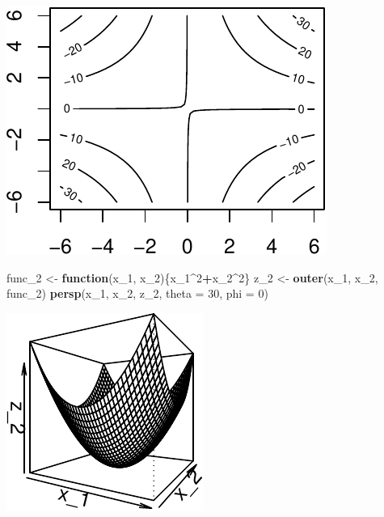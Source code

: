 \documentclass[11pt,]{article}
\newenvironment{Shaded}{\begin{snugshade}}{\end{snugshade}}
\newcommand{\KeywordTok}[1]{\textcolor[rgb]{0.13,0.29,0.53}{\textbf{#1}}}
\newcommand{\DataTypeTok}[1]{\textcolor[rgb]{0.13,0.29,0.53}{#1}}
\newcommand{\DecValTok}[1]{\textcolor[rgb]{0.00,0.00,0.81}{#1}}
\newcommand{\StringTok}[1]{\textcolor[rgb]{0.31,0.60,0.02}{#1}}
\newcommand{\ControlFlowTok}[1]{\textcolor[rgb]{0.13,0.29,0.53}{\textbf{#1}}}
\newcommand{\OperatorTok}[1]{\textcolor[rgb]{0.81,0.36,0.00}{\textbf{#1}}}
\newcommand{\NormalTok}[1]{#1}
\begin{document}
\begin{center}\includegraphics{Optimization_2_files/figure-latex/level_sets-2} \end{center}

\begin{Shaded}
\begin{Highlighting}[]
\NormalTok{func_}\DecValTok{2}\NormalTok{ <-}\StringTok{ }\ControlFlowTok{function}\NormalTok{(x_}\DecValTok{1}\NormalTok{, x_}\DecValTok{2}\NormalTok{)\{x_}\DecValTok{1}\OperatorTok{^}\DecValTok{2}\OperatorTok{+}\NormalTok{x_}\DecValTok{2}\OperatorTok{^}\DecValTok{2}\NormalTok{\}}
\NormalTok{z_}\DecValTok{2}\NormalTok{ <-}\StringTok{ }\KeywordTok{outer}\NormalTok{(x_}\DecValTok{1}\NormalTok{, x_}\DecValTok{2}\NormalTok{, func_}\DecValTok{2}\NormalTok{)}
\KeywordTok{persp}\NormalTok{(x_}\DecValTok{1}\NormalTok{, x_}\DecValTok{2}\NormalTok{, z_}\DecValTok{2}\NormalTok{, }\DataTypeTok{theta =} \DecValTok{30}\NormalTok{, }\DataTypeTok{phi =} \DecValTok{0}\NormalTok{)}
\end{Highlighting}
\end{Shaded}

\begin{center}\includegraphics{Optimization_2_files/figure-latex/level_sets-3} \end{center}
\end{document}
